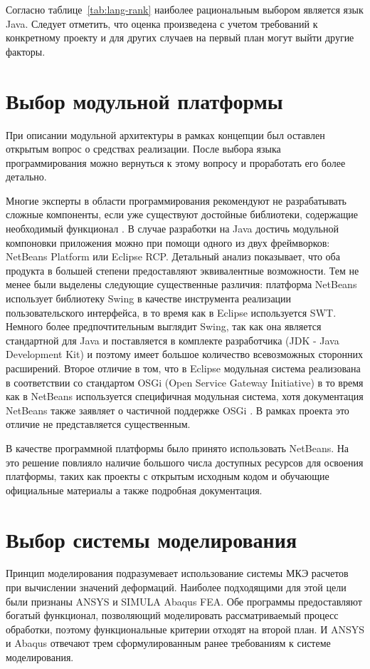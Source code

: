 \documentclass[14pt,oneside,final]{extreport}
\begin{document}
	Согласно таблице~\ref{tab:lang-rank} наиболее рациональным выбором является язык Java. Следует отметить, что оценка произведена с учетом требований к конкретному проекту и для других случаев на первый план могут выйти другие факторы.
	
	\section{Выбор модульной платформы}
	При описании модульной архитектуры в рамках концепции был оставлен открытым вопрос о средствах реализации. После выбора языка программирования можно вернуться к этому вопросу и проработать его более детально. 
	
	Многие эксперты в области программирования рекомендуют не разрабатывать сложные компоненты, если уже существуют достойные библиотеки, содержащие необходимый функционал \cite{Bloch}. В случае разработки на Java достичь модульной компоновки приложения можно при помощи одного из двух фреймворков: NetBeans Platform или Eclipse RCP. Детальный анализ показывает, что оба продукта в большей степени предоставляют эквивалентные возможности. Тем не менее были выделены следующие существенные различия: платформа NetBeans использует библиотеку Swing в качестве инструмента реализации пользовательского интерфейса, в то время как в Eclipse используется SWT. Немного более предпочтительным выглядит Swing, так как она является стандартной для Java и поставляется в комплекте разработчика (JDK - Java Development Kit) и поэтому имеет большое количество всевозможных сторонних расширений. Второе отличие в том, что в Eclipse модульная система реализована в соответствии со стандартом OSGi (Open Service Gateway Initiative) в то время как в NetBeans используется специфичная модульная система, хотя документация NetBeans также заявляет о частичной поддержке OSGi \cite{book:NetBeans}. В рамках проекта это отличие не представляется существенным. 
	
	В качестве программной платформы  было принято использовать NetBeans. На это решение повлияло наличие большого числа доступных ресурсов для освоения платформы, таких как проекты с открытым исходным кодом и обучающие официальные материалы а также подробная документация.

	\section{Выбор системы моделирования}
	Принцип моделирования подразумевает использование системы МКЭ расчетов при вычислении значений деформаций. Наиболее подходящими для этой цели были признаны ANSYS и SIMULA Abaqus FEA. Обе программы предоставляют богатый функционал, позволяющий моделировать рассматриваемый процесс обработки, поэтому функциональные критерии отходят на второй план. И ANSYS и Abaqus отвечают трем сформулированным ранее требованиям к системе моделирования. 
	
\end{document}
